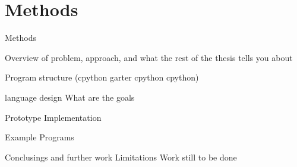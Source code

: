 \glsresetall %
\chapter{Methods}\label{ch:Methods}
Methods

Overview of problem, approach, and what the rest of the thesis tells you about

Program structure (cpython garter cpython cpython)


\chap language design
What are the goals

\chap Prototype Implementation

\chap Example Programs

\chap Conclusings and further work
Limitations
Work still to be done

